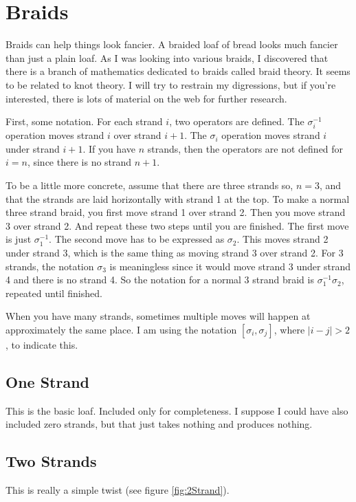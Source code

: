 \documentclass[10pt, openany]{book}
\begin{document}
\section{Braids}
\label{tip:Braid}
Braids can help things look fancier.  A braided loaf of bread looks much fancier than just a plain loaf.  As I was looking into various braids, I discovered that there is a branch of mathematics dedicated to braids called braid theory.  It seems to be related to knot theory.  I will try to restrain my digressions, but if you're interested, there is lots of material on the web for further research.

First, some notation.  For each strand $i$, two operators are defined.  The $\sigma^{-1}_i$ operation moves strand $i$ over strand $i+1$.  The $\sigma_i$ operation moves strand $i$ under strand $i+1$.  If you have $n$ strands, then the operators are not defined for $i=n$, since there is no strand $n+1$.

To be a little more concrete, assume that there are three strands so, $n=3$, and that the strands are laid horizontally with strand 1 at the top.  To make a normal three strand braid, you first move strand 1 over strand 2.  Then you move strand 3 over strand 2.  And repeat these two steps until you are finished.  The first move is just $\sigma^{-1}_1$.  The second move has to be expressed as $\sigma_2$.  This moves strand 2 under strand 3, which is the same thing as moving strand 3 over strand 2.  For 3 strands, the notation $\sigma_3$ is meaningless since it would move strand 3 under strand 4 and there is no strand 4.  So the notation for a normal 3 strand braid is $\sigma^{-1}_1\sigma_2$, repeated until finished.

When you have many strands, sometimes multiple moves will happen at approximately the same place.  I am using the notation $[\sigma_i, \sigma_j]$, where $\lvert i-j \rvert > 2$, to indicate this.

\subsection{One Strand}
This is the basic loaf.  Included only for completeness.  I suppose I could have also included zero strands, but that just takes nothing and produces nothing.

\subsection{Two Strands}
This is really a simple twist (see figure \ref{fig:2Strand}).
\end{document}
